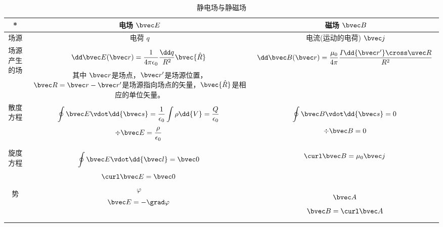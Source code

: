 
\begin{issues}
\issueDraft
\end{issues}

\begin{table}[ht]
\centering
\caption{静电场与静磁场}\label{tab_estfid1}
\begin{tabular}{|c|c|c|}
\hline
* & 电场 $\bvec E$ & 磁场 $\bvec B$\\
\hline
场源 & 电荷 $q$ & 电流(运动的电荷) $\bvec j$ \\
\hline
场源产生的场 & $$\dd \bvec E (\bvec r) = \frac{1}{4 \pi \epsilon_0} \frac{\dd q}{R^2} \bvec {\hat R}~ $$
其中 $\bvec r$是场点，$\bvec r'$是场源位置，$\bvec R = \bvec r - \bvec r'$是场源指向场点的矢量，$\bvec{\hat R}$是相应的单位矢量。
& $$\dd \bvec B(\bvec r) = \frac{\mu_0}{4\pi} \frac{I \dd{\bvec r'} \cross \uvec R}{R^2}~$$ \\
\hline
散度方程 & 
$$\oint \bvec E \vdot \dd{\bvec s} = \frac{1}{\epsilon_0}\int \rho \dd{V} = \frac{Q}{\epsilon_0}~$$
$$\div \bvec E = \frac{\rho}{\epsilon_0}~$$ 
&
$$\oint \bvec B \vdot \dd{\bvec s} = 0~$$
$$\div \bvec B = 0~$$ \\
\hline
旋度方程 & 
$$ \oint \bvec E \vdot \dd{\bvec l} = \bvec 0~$$
$$ \curl \bvec E = \bvec 0 ~$$ & $$\curl \bvec B = \mu_0 \bvec j~$$ \\
\hline
势 & $$\varphi~$$ $$\bvec E = -\grad \varphi~$$ & $$\bvec A~$$ $$\bvec B = \curl \bvec A~$$\\
\hline 
\end{tabular}
\end{table}
